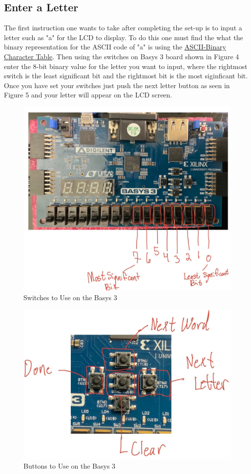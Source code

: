 \documentclass{article}
\begin{document}
\subsection{Enter a Letter}
The first instruction one wants to take after completing the set-up is to input 
a letter such as "a" for the LCD to display. To do this one must 
find the what the binary representation for the ASCII code of "a" is using the 
\href{https://abcfundkids.blogspot.com/2021/11/8-bit-binary-code-alphabet-get-ascii.html}{ASCII-Binary Character Table}.
Then using the switches on Basys 3 board shown in Figure 4 enter the 8-bit 
binary value for the letter you want to input, where the rightmost
switch is the least significant bit and the rightmost bit is the most siginficant
bit. 
Once you have set your switches just push the next letter button as seen in Figure 5 and your letter 
will appear on the LCD screen. 
\begin{figure} [ht!]
\centering
\includegraphics[width=0.7\linewidth]{Switches.jpg}
  \caption{Switches to Use on the Basys 3}
  \label{fig:fig4}
\end{figure}
\newpage

\begin{figure} [ht!]
\centering
\includegraphics[width=0.7\linewidth]{Buttons.jpg}
  \caption{Buttons to Use on the Basys 3}
  \label{fig:fig5}
\end{figure}
\newpage
\end{document}
